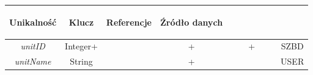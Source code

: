 \documentclass[12pt,oneside]{report}
\begin{document}
\begin{enumerate}[start=10,label={\bfseries REL\textbackslash\arabic*}]
\begin{table}[H]
\begin{tabular}{|c|c|c|c|c|c|c|c|c|c|}
			\begin{sideways}Unikalność \end{sideways}& 
			\begin{sideways}Klucz \end{sideways}& 
			\begin{sideways}Referencje \end{sideways}&
			\begin{sideways}Źródło danych\end{sideways}\\
			\hline
			\textit{unitID}&Integer+&&+&&&+&&&SZBD\\	
			\hline
			\textit{unitName}&String&&+&&&&&&USER\\	
			\hline
		\end{tabular}
	\end{table}
	

\end{enumerate}
\end{document}
